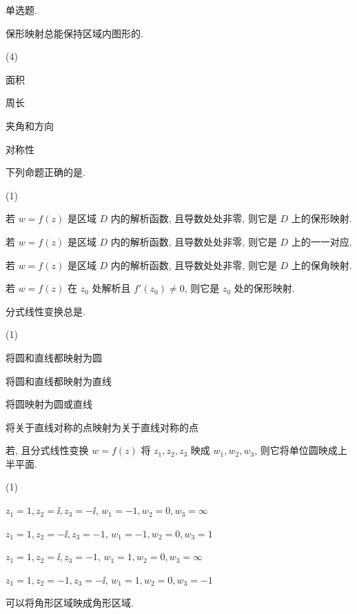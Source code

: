 \begin{homework}
  \item 单选题.
  \begin{homework}
    \item 保形映射总能保持区域内图形的\fillbrace{}.
    \begin{exchoice}(4)
      \item 面积
      \item 周长
      \item 夹角和方向
      \item 对称性
    \end{exchoice}
    \item 下列命题正确的是\fillbrace{}.
    \begin{exchoice}(1)
      \item 若 $w=f(z)$ 是区域 $D$ 内的解析函数, 且导数处处非零, 则它是 $D$ 上的保形映射.
      \item 若 $w=f(z)$ 是区域 $D$ 内的解析函数, 且导数处处非零, 则它是 $D$ 上的一一对应.
      \item 若 $w=f(z)$ 是区域 $D$ 内的解析函数, 且导数处处非零, 则它是 $D$ 上的保角映射.
      \item 若 $w=f(z)$ 在 $z_0$ 处解析且 $f'(z_0)\neq0$, 则它是 $z_0$ 处的保形映射.
    \end{exchoice}
    \item 分式线性变换总是\fillbrace{}.
    \begin{exchoice}(1)
      \item 将圆和直线都映射为圆
      \item 将圆和直线都映射为直线
      \item 将圆映射为圆或直线
      \item 将关于直线对称的点映射为关于直线对称的点
    \end{exchoice}
    \item 若\fillbrace{}, 且分式线性变换 $w=f(z)$ 将 $z_1,z_2,z_3$ 映成 $w_1,w_2,w_3$, 则它将单位圆映成上半平面.
    \begin{exchoice}(1)
      \item $z_1=1,z_2=\ii,z_3=-\ii$, $w_1=-1,w_2=0,w_3=\infty$
      \item $z_1=1,z_2=-\ii,z_3=-1$, $w_1=-1,w_2=0,w_3=1$
      \item $z_1=1,z_2=\ii,z_3=-1$, $w_1=1,w_2=0,w_3=\infty$
      \item $z_1=1,z_2=-1,z_3=-\ii$, $w_1=1,w_2=0,w_3=-1$
    \end{exchoice}
    \item \fillbrace{}可以将角形区域映成角形区域.

\end{homework}
\end{homework}

